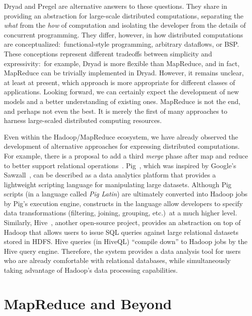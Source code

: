 Dryad and Pregel are alternative answers to these questions.  They
share in providing an abstraction for large-scale distributed
computations, separating the {\it what} from the {\it how} of
computation and isolating the developer from the details of concurrent
programming.  They differ, however, in how distributed computations
are conceptualized:\ functional-style programming, arbitrary
dataflows, or BSP.  These conceptions represent different tradeoffs
between simplicity and expressivity:\ for example, Dryad is more
flexible than MapReduce, and in fact, MapReduce can be trivially
implemented in Dryad.  However, it remains unclear, at least at
present, which approach is more appropriate for different classes of
applications.  Looking forward, we can certainly expect the
development of new models and a better understanding of existing ones.
MapReduce is not the end, and perhaps not even the best.  It is merely
the first of many approaches to harness large-scaled distributed
computing resources.

Even within the Hadoop/MapReduce ecosystem, we have already observed
the development of alternative approaches for expressing distributed
computations.  For example, there is a proposal to add a third {\it
  merge} phase after map and reduce to better support relational
operations~\cite{YangHungchih_etal_SIGMOD2007}.
Pig~\cite{Olston_etal_SIGMOD2008}, which was inspired by Google's
Sawzall~\cite{Pike_etal_2005}, can be described as a data analytics
platform that provides a lightweight scripting language for
manipulating large datasets.  Although Pig scripts (in a language
called {\it Pig Latin}) are ultimately converted into Hadoop jobs by
Pig's execution engine, constructs in the language allow developers to
specify data transformations (filtering, joining, grouping, etc.)\ at
a much higher level.  Similarly, Hive~\cite{Hammerbacher_2009},
another open-source project, provides an abstraction on top of Hadoop
that allows users to issue SQL queries against large relational
datasets stored in HDFS.  Hive queries (in HiveQL) ``compile down'' to
Hadoop jobs by the Hive query engine.  Therefore, the system provides
a data analysis tool for users who are already comfortable with
relational databases, while simultaneously taking advantage of
Hadoop's data processing capabilities.

\section{MapReduce and Beyond}
\label{chapter-conclusion:end}

